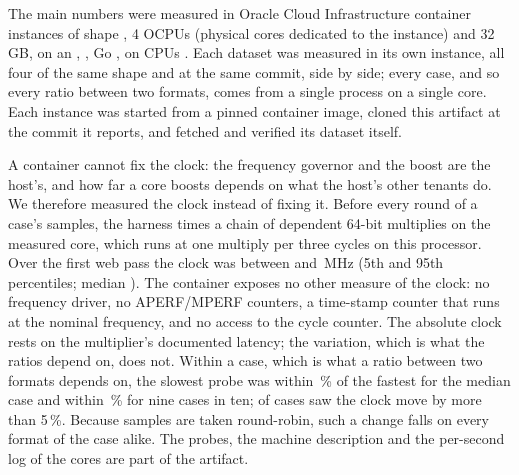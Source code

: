 {\sloppy The main numbers were measured in Oracle Cloud Infrastructure container
instances of shape , 4 OCPUs (physical cores
dedicated to the instance) and 32\,GB, on an ,
, Go , on CPUs
. Each dataset was measured in its own
instance, all four of the same shape and at the same commit, side by side;
every case, and so every ratio between two formats, comes from a single
process on a single core. Each instance was started from a pinned container
image, cloned this artifact at the commit it reports, and fetched and
verified its dataset itself.\par}

A container cannot fix the clock: the frequency governor and the boost are
the host's, and how far a core boosts depends on what the host's other
tenants do. We therefore measured the clock instead of fixing it. Before
every round of a case's samples, the harness times a chain of dependent
64-bit multiplies on the measured core, which runs at one multiply per three
cycles on this processor. Over the first web pass the clock was between
 and \,MHz (5th and 95th
percentiles; median ). The container exposes no other measure of the
clock: no frequency driver, no APERF/MPERF counters, a time-stamp counter
that runs at the nominal frequency, and no access to the cycle counter. The
absolute clock rests on the multiplier's documented latency; the variation,
which is what the ratios depend on, does not. Within a case, which is
what a ratio between two formats depends on, the slowest probe was within
\,\% of the fastest for the median case and
within \,\% for nine cases in ten;
 of  cases saw the
clock move by more than 5\,\%. Because samples are taken round-robin, such a
change falls on every format of the case alike. The probes, the machine
description and the per-second log of the cores are part of the artifact.

